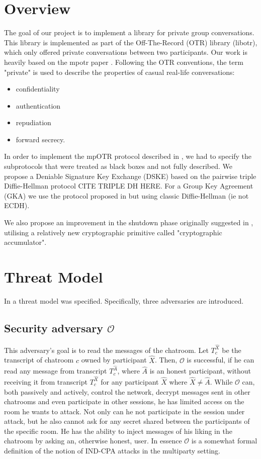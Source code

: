 \documentclass[12pt,titlepage,a4paper]{article}
\begin{document}
\tableofcontents
\newpage
{
\section{Overview}
The goal of our project is to implement a library for private group conversations.
This library is implemented as part of the Off-The-Record (OTR) library (libotr), which only offered private conversations between two participants.
Our work is heavily based on the mpotr paper \cite{mpotr}.
Following the OTR conventions, the term "private" is used to describe the properties of casual real-life conversations:

\begin{itemize}
  \item confidentiality
  \item authentication
  \item repudiation
  \item forward secrecy.
\end{itemize}

In order to implement the mpOTR protocol described in \cite{mpotr}, we had to specify the subprotocols that were treated as black boxes and not fully described.
We propose a Deniable Signature Key Exchange (DSKE) based on the pairwise triple Diffie-Hellman protocol CITE TRIPLE DH HERE.
For a Group Key Agreement (GKA) we use the protocol proposed in \cite{mpenc} but using classic Diffie-Hellman (ie not ECDH).

We also propose an improvement in the shutdown phase originally suggested in \cite{mpotr},
utilising a relatively new cryptographic primitive called "cryptographic accumulator".

\section{Threat Model}
\label{threat_model}
In \cite{mpotr} a threat model was specified. Specifically, three adversaries are introduced.

\subsection{Security adversary $\mathcal{O}$}
This adversary's goal is to read the messages of the chatroom.
Let $T_c^{\hat{X}}$ be the transcript of chatroom $c$ owned by participant $\hat{X}$.
Then, $\mathcal{O}$ is successful, if he can read any message from transcript $T_c^{\hat{A}}$, where $\hat{A}$ is an honest participant, without receiving it from transcript $T_c^{\hat{X}}$ for any participant $\hat{X}$ where $\hat{X} \ne \hat{A}$.
While $\mathcal{O}$ can, both passively and actively, control the network, decrypt messages sent in other chatrooms and even participate in other sessions, he has limited access on the room he wants to attack.
Not only can he not participate in the session under attack, but he also cannot ask for any secret shared between the participants of the specific room.
He has the ability to inject messages of his liking in the chatroom by asking an, otherwise honest, user.
In essence $\mathcal{O}$ is a somewhat formal definition of the notion of IND-CPA attacks in the multiparty setting.

}
\end{document}
